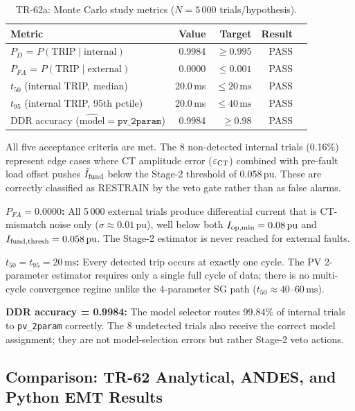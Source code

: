 \documentclass[11pt, a4paper]{article}
\newcommand{\pu}{\,\text{pu}}
\begin{document}
\begin{table}[!t]
\centering
\caption{TR-62a: Monte Carlo study metrics ($N=5\,000$ trials/hypothesis).}
\label{tab:mc_metrics}
\renewcommand{\arraystretch}{1.10}
\begin{tabular}{lrrrl}
\toprule
Metric & Value & Target & Result \\
\midrule
$P_D$  = $P(\text{TRIP}\mid\text{internal})$ & 0.9984 & $\geq 0.995$ & PASS \\
$P_{FA}$ = $P(\text{TRIP}\mid\text{external})$ & 0.0000 & $\leq 0.001$ & PASS \\
$t_{50}$ (internal TRIP, median)              & 20.0\,ms & $\leq 20\,\text{ms}$ & PASS \\
$t_{95}$ (internal TRIP, 95th pctile)         & 20.0\,ms & $\leq 40\,\text{ms}$ & PASS \\
DDR accuracy ($\hat{\text{model}}=\texttt{pv\_2param}$) & 0.9984 & $\geq 0.98$ & PASS \\
\bottomrule
\end{tabular}
\end{table}

All five acceptance criteria are met.  The 8 non-detected internal trials
(0.16\%) represent edge cases where CT amplitude error ($\varepsilon_{\rm CT}$)
combined with pre-fault load offset pushes $\hat{I}_{\rm fund}$ below the
Stage-2 threshold of $0.058\pu$.  These are correctly classified as
RESTRAIN by the veto gate rather than as false alarms.

\noindent\textbf{$P_{FA} = 0.0000$:}  All 5\,000 external trials produce
differential current that is CT-mismatch noise only ($\sigma \approx 0.01\pu$),
well below both $I_{\rm op,min}=0.08\pu$ and $I_{\rm fund,thresh}=0.058\pu$.
The Stage-2 estimator is never reached for external faults.

\noindent\textbf{$t_{50}=t_{95}=20\,\text{ms}$:}  Every detected trip occurs at
exactly one cycle.  The PV 2-parameter estimator requires only a single full
cycle of data; there is no multi-cycle convergence regime unlike the 4-parameter
SG path ($t_{50}\approx 40$--$60\,\text{ms}$).

\noindent\textbf{DDR accuracy = 0.9984:}  The model selector routes
99.84\% of internal trials to \texttt{pv\_2param} correctly.  The 8 undetected
trials also receive the correct model assignment; they are not model-selection
errors but rather Stage-2 veto actions.

\subsection{Comparison: TR-62 Analytical, ANDES, and Python EMT Results}
\end{document}
